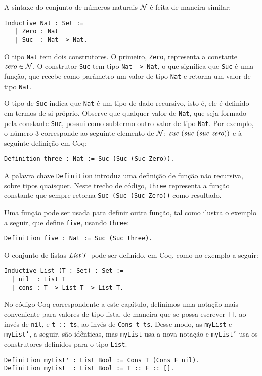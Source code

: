 A sintaxe do conjunto de n\'umeros naturais $\mathcal{N}$ \'e feita de maneira similar:
\begin{lstlisting}
Inductive Nat : Set :=
   | Zero : Nat
   | Suc  : Nat -> Nat.
\end{lstlisting}
O tipo \texttt{Nat} tem dois construtores. O primeiro, \texttt{Zero}, representa a constante $\textit{zero\/}\in \mathcal{N}$. O construtor \texttt{Suc} tem tipo \texttt{Nat -> Nat}, o que significa que  \texttt{Suc} é uma função, que recebe como par\^ametro um valor de tipo \texttt{Nat} e retorna um valor de tipo \texttt{Nat}.

O tipo de \texttt{Suc} indica que \texttt{Nat} \'e um tipo de dado recursivo, isto \'e, ele \'e definido em termos de si pr\'oprio. Observe que qualquer valor de \texttt{Nat}, que seja formado pela constante \texttt{Suc}, possui como subtermo outro valor de tipo \texttt{Nat}. Por exemplo, o n\'umero $3$ corresponde ao seguinte elemento de $\mathcal{N}$: $\textit{suc\/}\,\,(\textit{suc\/}\,\,(\textit{suc\/}\,\,\textit{zero\/}))$ e à seguinte defini\c{c}\~ao em Coq:
\begin{lstlisting}
Definition three : Nat := Suc (Suc (Suc Zero)).
\end{lstlisting}
A palavra chave \texttt{Definition} introduz uma defini\c{c}\~ao de função n\~ao recursiva, sobre tipos quaisquer. Neste trecho de c\'odigo, \texttt{three} representa a fun\c{c}\~ao constante que sempre retorna \texttt{Suc (Suc (Suc Zero))} como resultado.

Uma função pode ser usada para definir outra função, tal como ilustra o exemplo a seguir, que define \texttt{five}, usando \texttt{three}:
\begin{lstlisting}
Definition five : Nat := Suc (Suc three).
\end{lstlisting}

O conjunto de listas $\textit{List\/}\,\mathcal{T}$ pode ser definido, em Coq, como no exemplo a seguir:
\begin{lstlisting}
Inductive List (T : Set) : Set :=
  | nil  : List T
  | cons : T -> List T -> List T.
\end{lstlisting}

No código Coq correspondente a este capítulo, definimos uma nota\c{c}\~ao mais conveniente para valores de tipo lista, de maneira que se possa escrever \texttt{[]}, ao inv\'es de \texttt{nil}, e \texttt{t :: ts}, ao inv\'es de \texttt{Cons t ts}. Desse modo, as \texttt{myList} e \texttt{myList'}, a seguir, s\~ao id\^enticas, mas \texttt{myList} usa a nova notação e \texttt{myList'} usa os construtores definidos para o tipo \texttt{List}.
\begin{lstlisting}
Definition myList' : List Bool := Cons T (Cons F nil).
Definition myList  : List Bool := T :: F :: [].
\end{lstlisting}

